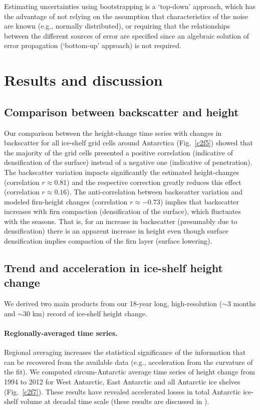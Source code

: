 Estimating uncertainties using bootstrapping is a `top-down' approach, which has the advantage of not relying on the assumption that characteristics of the noise are known (e.g., normally distributed), or requiring that the relationships between the different sources of error are specified since an algebraic solution of error propagation (`bottom-up' approach) is not required.

\section{Results and discussion}

\subsection{Comparison between backscatter and height}

\noindent
Our comparison between the height-change time series with changes in backscatter for all ice-shelf grid cells around Antarctica (Fig.~\ref{c2f5}) showed that the majority of the grid cells presented a positive correlation (indicative of densification of the surface) instead of a negative one (indicative of penetration). The backscatter variation impacts significantly the estimated height-changes (correlation $r \approx 0.81$) and the respective correction greatly reduces this effect (correlation $r \approx 0.16$). The anti-correlation between backscatter variation and modeled firn-height changes (correlation $r \approx -0.73$) implies that backscatter increases with firn compaction (densification of the surface), which fluctuates with the seasons. That is, for an increase in backscatter (presumably due to densification) there is an apparent increase in height even though surface densification implies compaction of the firn layer (surface lowering).

\subsection{Trend and acceleration in ice-shelf height change}

\noindent
We derived two main products from our 18-year long, high-resolution ($\sim$3 months and $\sim$30 km) record of ice-shelf height change.

\paragraph{Regionally-averaged time series.} Regional averaging increases the statistical significance of the information that can be recovered from the available data (e.g., acceleration from the curvature of the fit). We computed circum-Antarctic average time series of height change from 1994 to 2012 for West Antarctic, East Antarctic and all Antarctic ice shelves (Fig.~\ref{c2f7}). These results have revealed accelerated losses in total Antarctic ice-shelf volume at decadal time scale (these results are discussed in \textcite{Paolo2015}).

